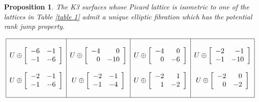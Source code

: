 \documentclass{amsart}
\newtheorem{proposition}[theorem]{Proposition}
\theoremstyle{definition}
\numberwithin{equation}{section}
\begin{document}
\begin{proposition}
The K3 surfaces whose Picard lattice is isometric to one of the lattices in Table \ref{table 1} admit a unique elliptic fibration which has the potential rank jump property. 
\begin{table}[h!]
$$\begin{array}{|c|c|c|c|}
\hline
&&&\\


U\oplus \left[\begin{array}{rr}-6&-1\\-1&-6\end{array}\right]
&
U\oplus \left[\begin{array}{rr}-4&0\\0&-10\end{array}\right]
&
 U\oplus \left[\begin{array}{rr}-4&0\\0&-6\end{array}\right]%
&
U\oplus \left[\begin{array}{rr}-2&-1\\-1&-10\end{array}\right]
\\
&&&\\
U\oplus \left[\begin{array}{rr}-2&-1\\-1&-6\end{array}\right]
&
U\oplus \left[\begin{array}{rr}-2&-1\\-1&-4\end{array}\right]
&
U\oplus \left[\begin{array}{rr}-2&1\\1&-2\end{array}\right]
&
U\oplus \left[\begin{array}{rr}-2&0\\0&-2\end{array}\right]\\
&&&\\
\hline\end{array}
$$

\end{table}
\begin{table}[h!]
\caption{Intersection form for Picard lattices of rank 4 of K3s with a unique elliptic fibration known to have the potentially rank jump property}
\label{table 1}
\end{table}
\end{proposition}
\end{document}
